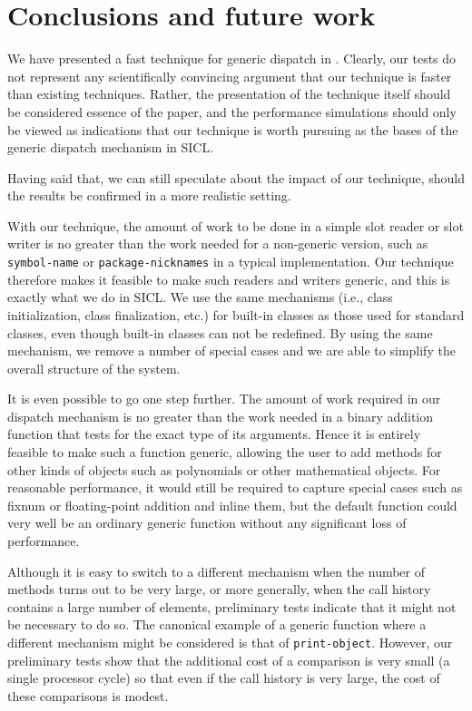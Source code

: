 \section{Conclusions and future work}

We have presented a fast technique for generic dispatch in \cl{}.
Clearly, our tests do not represent any scientifically convincing
argument that our technique is faster than existing
techniques. Rather, the presentation of the technique itself should be
considered essence of the paper, and the performance simulations
should only be viewed as indications that our technique is worth
pursuing as the bases of the generic dispatch mechanism in SICL.

Having said that, we can still speculate about the impact of our
technique, should the results be confirmed in a more realistic setting. 

With our technique, the amount of work to be done in a simple slot reader
or slot writer is no greater than the work needed for a non-generic
version, such as \texttt{symbol-name} or \texttt{package-nicknames} in
a typical \cl{} implementation.  Our technique therefore makes it
feasible to make such readers and writers generic, and this is exactly
what we do in SICL.  We use the same \clos{} mechanisms (i.e., class
initialization, class finalization, etc.) for built-in classes as
those used for standard classes, even though built-in classes can not
be redefined.  By using the same mechanism, we remove a number of
special cases and we are able to simplify the overall structure of the
system. 

It is even possible to go one step further.  The amount of work
required in our dispatch mechanism is no greater than the work needed
in a binary addition function that tests for the exact type of its
arguments.  Hence it is entirely feasible to make such a function
generic, allowing the user to add methods for other kinds of objects
such as polynomials or other mathematical objects.  For reasonable
performance, it would still be required to capture special cases such
as fixnum or floating-point addition and inline them, but the default
function could very well be an ordinary generic function without any
significant loss of performance. 

Although it is easy to switch to a different mechanism when the number
of methods turns out to be very large, or more generally, when the
call history contains a large number of elements, preliminary tests
indicate that it might not be necessary to do so.  The canonical
example of a generic function where a different mechanism might be
considered is that of \texttt{print-object}.  However, our preliminary
tests show that the additional cost of a comparison is very small (a
single processor cycle) so that even if the call history is very
large, the cost of these comparisons is modest. 

